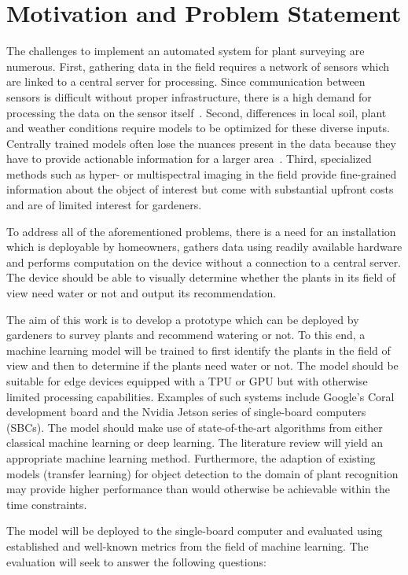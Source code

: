 \documentclass[draft,final]{vutinfth} %
\begin{document}
\section{Motivation and Problem Statement}
\label{sec:motivation}

The challenges to implement an automated system for plant surveying
are numerous. First, gathering data in the field requires a network of
sensors which are linked to a central server for processing. Since
communication between sensors is difficult without proper
infrastructure, there is a high demand for processing the data on the
sensor itself~\cite{mcenroe2022}. Second, differences in local soil,
plant and weather conditions require models to be optimized for these
diverse inputs. Centrally trained models often lose the nuances
present in the data because they have to provide actionable
information for a larger area~\cite{awad2019}. Third, specialized
methods such as hyper- or multispectral imaging in the field provide
fine-grained information about the object of interest but come with
substantial upfront costs and are of limited interest for gardeners.

To address all of the aforementioned problems, there is a need for an
installation which is deployable by homeowners, gathers data using
readily available hardware and performs computation on the device
without a connection to a central server. The device should be able to
visually determine whether the plants in its field of view need water
or not and output its recommendation.

The aim of this work is to develop a prototype which can be deployed
by gardeners to survey plants and recommend watering or not. To this
end, a machine learning model will be trained to first identify the
plants in the field of view and then to determine if the plants need
water or not. The model should be suitable for edge devices equipped
with a TPU or GPU but with otherwise limited processing
capabilities. Examples of such systems include Google's Coral
development board and the Nvidia Jetson series of single-board
computers (SBCs). The model should make use of state-of-the-art
algorithms from either classical machine learning or deep
learning. The literature review will yield an appropriate machine
learning method. Furthermore, the adaption of existing models
(transfer learning) for object detection to the domain of plant
recognition may provide higher performance than would otherwise be
achievable within the time constraints.

The model will be deployed to the single-board computer and evaluated
using established and well-known metrics from the field of machine
learning. The evaluation will seek to answer the following questions:
\end{document}

